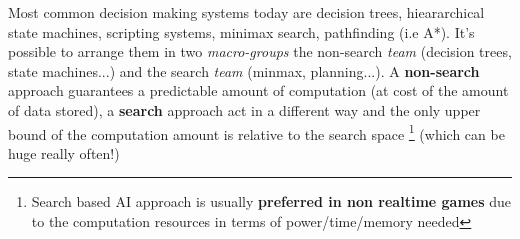 Most common decision making systems today are decision trees, hieararchical state machines, scripting systems, minimax search, pathfinding (i.e A*). It's possible to arrange them in two \textit{macro-groups} the non-search \textit{team} (decision trees, state machines...) and the search \textit{team} (minmax, planning...).
A \textbf{non-search} approach guarantees a predictable amount of computation 	(at cost of the amount of data stored), a \textbf{search} approach act in a different way and the only upper bound of the computation amount is relative to the search space
\footnote{Search based AI approach is usually \textbf{preferred in non realtime games} due to the computation resources in terms of power/time/memory needed} (which can be huge really often!)